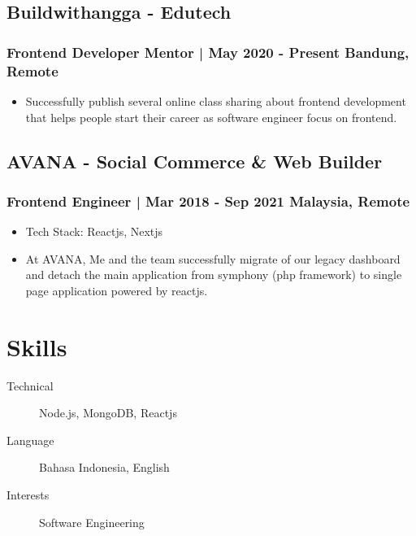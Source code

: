 \documentclass[11pt]{article}
\begin{document}
\subsection{Buildwithangga - Edutech}
\subsubsection{Frontend Developer Mentor | May 2020 - Present \hfill Bandung, Remote}
\begin{itemize}
    \item Successfully publish several online class sharing about frontend development that helps people start their career as software engineer focus on frontend.
\end{itemize}

\subsection{AVANA - Social Commerce \& Web Builder}
\subsubsection{Frontend Engineer | Mar 2018 - Sep 2021 \hfill Malaysia, Remote}
\begin{itemize}
    \item Tech Stack: Reactjs, Nextjs
    \item At AVANA, Me and the team successfully migrate of our legacy dashboard and detach the main application from symphony (php framework) to single page application powered by reactjs.
\end{itemize}

\section{Skills}
\begin{description}
    \item[Technical] Node.js, MongoDB, Reactjs
    \item[Language] Bahasa Indonesia, English
    \item[Interests] Software Engineering
\end{description}
\end{document}
